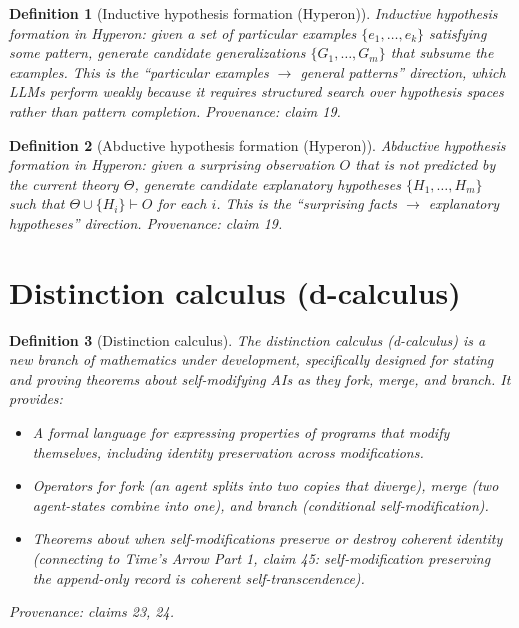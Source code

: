 \documentclass[11pt]{article}
\newtheorem{definition}{Definition}
\begin{document}
\begin{definition}[Inductive hypothesis formation (Hyperon)]\label{def:induction}
\emph{Inductive hypothesis formation} in Hyperon: given a set of particular
examples $\{e_1, \ldots, e_k\}$ satisfying some pattern, generate candidate
generalizations $\{G_1, \ldots, G_m\}$ that subsume the examples.  This is
the ``particular examples $\to$ general patterns'' direction, which LLMs
perform weakly because it requires structured search over hypothesis spaces
rather than pattern completion.
\emph{Provenance: claim 19.}
\end{definition}

\begin{definition}[Abductive hypothesis formation (Hyperon)]\label{def:abduction}
\emph{Abductive hypothesis formation} in Hyperon: given a surprising
observation $O$ that is not predicted by the current theory $\Theta$,
generate candidate explanatory hypotheses $\{H_1, \ldots, H_m\}$ such
that $\Theta \cup \{H_i\} \vdash O$ for each $i$.  This is the
``surprising facts $\to$ explanatory hypotheses'' direction.
\emph{Provenance: claim 19.}
\end{definition}


\section{Distinction calculus (d-calculus)}

\begin{definition}[Distinction calculus]\label{def:dcalc}
The \emph{distinction calculus} (d-calculus) is a new branch of mathematics
under development, specifically designed for stating and proving theorems
about self-modifying AIs as they \emph{fork}, \emph{merge}, and
\emph{branch}.  It provides:
\begin{itemize}
  \item A formal language for expressing properties of programs that modify
    themselves, including identity preservation across modifications.
  \item Operators for fork (an agent splits into two copies that diverge),
    merge (two agent-states combine into one), and branch (conditional
    self-modification).
  \item Theorems about when self-modifications preserve or destroy
    coherent identity (connecting to Time's Arrow Part 1, claim 45:
    self-modification preserving the append-only record is coherent
    self-transcendence).
\end{itemize}
\emph{Provenance: claims 23, 24.}
\end{definition}
\end{document}
